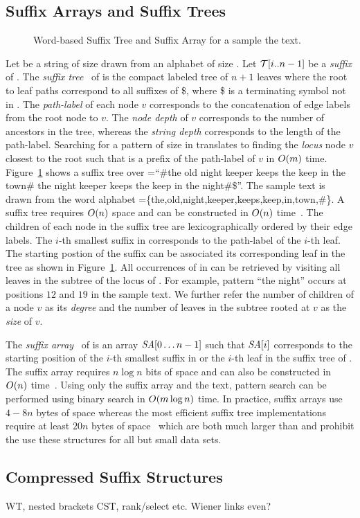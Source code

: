 
\subsection{Suffix Arrays and Suffix Trees}


\begin{figure}
\centering

\caption{Word-based Suffix Tree and Suffix Array for a sample the 
text.}
\label{fig-suffix-tree}
\end{figure}

Let {\col} be a string of size {\collen} drawn from an alphabet {\alphabet} of
size {\alphabetsize}. Let {$\mathcal{T}[i..n-1]$} be a {\it suffix} of {\col}.
The {\it suffix tree}~\cite{w-swat73} of {\col} is the compact labeled
tree of $n+1$ leaves where the root to leaf paths correspond to all suffixes of {\col\$},
where \$ is a terminating symbol not in {\alphabet}. The {\it path-label}
of each node $v$ corresponds to the concatenation of edge labels from the
root node to $v$. The {\it node depth} of $v$ corresponds to the number
of ancestors in the tree, whereas the {\it string depth} corresponds to the
length of the path-label. Searching for a pattern {\pattern} of 
size {\plen} in {\col} translates to finding the {\it locus} node $v$ closest to
the root such that {\pattern} is a prefix of the path-label of $v$ in $O(m)$ time.
Figure~\ref{fig-suffix-tree} shows a suffix tree over {\col=``\#the old night keeper 
keeps the keep in the town\# the night keeper keeps the keep in the night\#\$}''. 
The sample text is drawn from the word alphabet 
{\alphabet=\{the,old,night,keeper,keeps,keep,in,town,\#\}}. A suffix tree requires $O(n)$ space 
and can be constructed in $O(n)$ time~\cite{u-algo95}. The children
of each node in the suffix tree are lexicographically ordered by their edge labels.
The $i$-th smallest suffix in {\col} corresponds to the path-label of the $i$-th 
leaf. The starting postion of the suffix can be associated its corresponding
leaf in the tree as shown in Figure~\ref{fig-suffix-tree}. All 
occurrences of {\pattern} in {\col} can be retrieved by visiting all leaves
in the subtree of the locus of {\pattern}. For example, pattern ``the night'' occurs
at positions $12$ and $19$ in the sample text. We further refer the number of children
of a node $v$ as its {\it degree} and the number of leaves in the subtree rooted at $v$
as the {\it size} of $v$.

The {\it suffix array}~\cite{mm-jcomp93} of {\col} is an array $\mbox{\emph{SA}}[0\ldots n-1]$ such
that $\mbox{\emph{SA}}[i]$ corresponds to the starting position of the $i$-th smallest suffix
in {\col} or the $i$-th leaf in the suffix tree of {\col}. The suffix array requires
$n \log n$ bits of space and can also be constructed in $O(n)$ time~\cite{ksb-jacm06}.
Using only the suffix array and the text, pattern search can be performed using binary search
in $O(m \log n)$ time.
In practice, suffix arrays use $4-8n$ bytes of space whereas the most efficient
suffix tree implementations require at least $20n$ bytes of space~\cite{k-spe99} which
are both much larger than {\col} and prohibit the use these structures for all but
small data sets.

\subsection{Compressed Suffix Structures}

WT, nested brackets CST, rank/select etc. Wiener links even?
